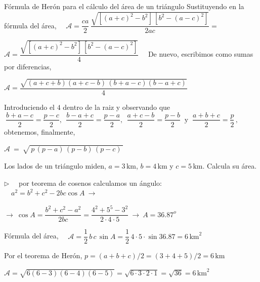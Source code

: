 \begin{myalertblock}{Fórmula de Herón para el cálculo del área de un triángulo}
\vspace{2mm} Sustituyendo en la fórmula del área, $\quad \mathcal A=\dfrac{ca}{2} \, \dfrac{\sqrt{[(a+c)^2-b^2]\,[b^2-(a-c)^2]}}{2ac} =$

\vspace{2mm} $\mathcal A=  \dfrac{\sqrt{[(a+c)^2-b^2]\,[b^2-(a-c)^2]}}{4}\quad$ De nuevo, escribimos como sumas por diferencias,

\vspace{2mm}  $\mathcal A=  \dfrac{\sqrt{(a+c+b)(a+c-b)\, (b+a-c)(b-a+c)}}{4}$

\vspace{2mm} Introduciendo el $4$ dentro de la raiz y observando que $\ \dfrac{b+a-c}{2}=\dfrac{p-c}{2},\ \ \dfrac{b-a+c}{2}=\dfrac{p-a}{2},\ \ \dfrac{a+c-b}{2}=\dfrac{p-b}{2}   \ \text{ y } \   \dfrac{a+b+c}{2}=\dfrac{p}{2}\, , \ $ obtenemos, finalmente,

\vspace{2mm} $\mathcal A \ = \ \sqrt{\, p\, (p-a)\, (p-b)\, (p-c)\, }$ \QED

\vspace{1mm}	
\end{myalertblock}

\vspace{4mm}

\begin{miejemplo}
	
	Los lados de un triángulo miden, $a=3 \, \mathrm{km}$, $b=4\,  \mathrm{km}$ y $c=5\,  \mathrm{km}$. Calcula su área.
	
\vspace{4mm} $\triangleright \quad $ por teorema de cosenos	calculamos un ángulo: $\quad a^2=b^2+c^2-2bc\cos A \ \to \ $

\vspace{3mm} $\to \ \cos A=\dfrac{b^2+c^2-a^2}{2bc}=\dfrac{4^2+5^5-3^2}{2\cdot 4\cdot 5 } \ \to \ A=36.87^o$

\vspace{2mm} Fórmula del área, $\quad \mathcal A=\dfrac 1 2\, b\, c\, \sin A=\dfrac 1 2 \, 4\cdot 5\cdot \sin 36.87 = 6\, \mathrm{km}^2$

\vspace{4mm} Por el teorema de Herón, $p=(a+b+c)/2=(3+4+5)/2=6\, \mathrm{km}$

\vspace{2mm} $\mathcal A=\sqrt{6(6-3)(6-4)(6-5)}=\sqrt{6\cdot 3\cdot 2 \cdot 1}=	\sqrt{36}=6\, \mathrm{km}^2$
\end{miejemplo}





